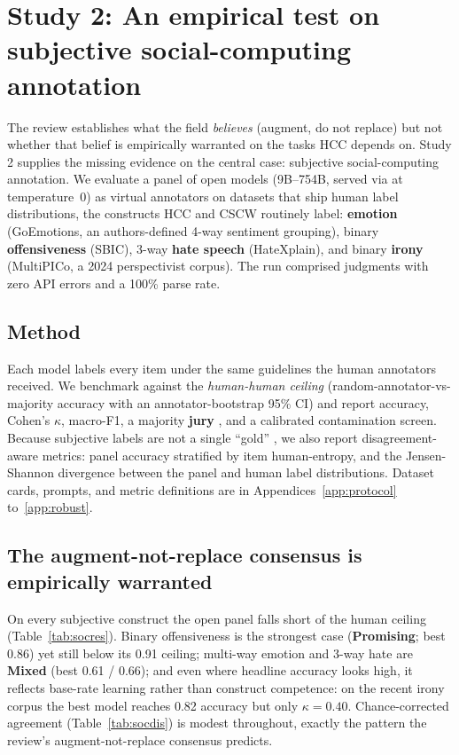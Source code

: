 \section{Study 2: An empirical test on subjective social-computing annotation}\label{sec:study2emp}
The review establishes what the field \emph{believes} (augment, do not replace) but not whether that belief is
empirically warranted on the tasks HCC depends on. Study 2 supplies the missing evidence on the central case:
subjective social-computing annotation. We evaluate a panel of \STHRmodels{} open models (9B--754B, served via
\PROVIDER{} at temperature~0) as virtual annotators on \SOCndat{} datasets that ship human label distributions, the
constructs HCC and CSCW routinely label: \textbf{emotion} (GoEmotions, an authors-defined 4-way sentiment grouping),
binary \textbf{offensiveness} (SBIC), 3-way \textbf{hate speech} (HateXplain), and binary \textbf{irony} (MultiPICo,
a 2024 perspectivist corpus). The run comprised \SOCnjudg{} judgments with zero API errors and a 100\% parse rate.

\subsection{Method}
Each model labels every item under the same guidelines the human annotators received. We benchmark against the
\emph{human-human ceiling} (random-annotator-vs-majority accuracy with an annotator-bootstrap 95\% CI) and report
accuracy, Cohen's $\kappa$, macro-F1, a majority \textbf{jury} \citep{verga2024poll}, and a calibrated contamination
screen. Because subjective labels are not a single ``gold'' \citep{aroyo2015truth,plank2022humanlabel}, we also
report disagreement-aware metrics: panel accuracy stratified by item human-entropy, and the Jensen-Shannon
divergence between the panel and human label distributions. Dataset cards, prompts, and metric definitions are in
Appendices~\ref{app:protocol} to~\ref{app:robust}.

\subsection{The augment-not-replace consensus is empirically warranted}
On every subjective construct the open panel falls short of the human ceiling (Table~\ref{tab:socres}). Binary
offensiveness is the strongest case (\textbf{Promising}; best 0.86) yet still below its 0.91 ceiling; multi-way
emotion and 3-way hate are \textbf{Mixed} (best 0.61 / 0.66); and even where headline accuracy looks high, it
reflects base-rate learning rather than construct competence: on the recent irony corpus the best model reaches 0.82
accuracy but only $\kappa{=}0.40$. Chance-corrected agreement (Table~\ref{tab:socdis}) is modest throughout, exactly
the pattern the review's augment-not-replace consensus predicts.

